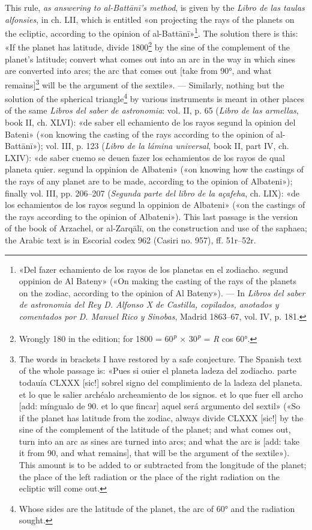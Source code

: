 \documentclass[11pt]{article}
\begin{document}
\par This rule, \emph{as answering to al-Battānī's method}, is given by the \emph{Libro de las taulas alfonsies}, in ch. LII, which is entitled «on projecting the rays of the planets on the ecliptic, according to the opinion of al-Battānī»\footnote{«Del fazer echamiento de los rayos de los planetas en el zodiacho. segund oppinion de Al Bateny» («On making the casting of the rays of the planets on the zodiac, according to the opinion of Al Bateny»). — In \emph{Libros del saber de astronomia del Rey D. Alfonso X de Castilla, copilados, anotados y comentados por D. Manuel Rico y Sinobas}, Madrid 1863–67, vol. IV, p. 181.}. The solution there is this: «If the planet has latitude, divide 1800\footnote{Wrongly 180 in the edition; for 1800 = 60\textsuperscript{\itshape p} × 30\textsuperscript{\itshape p} = \emph{R} cos 60°.} by the sine of the complement of the planet's latitude; convert what comes out into an arc in the way in which sines are converted into arcs; the arc that comes out [take from 90°, and what remains]\footnote{The words in brackets I have restored by a safe conjecture. The Spanish text of the whole passage is: «Pues si ouier el planeta ladeza del zodiacho. parte todauía CLXXX [sic!] sobrel signo del complimiento de la ladeza del planeta. et lo que le salier archéalo archeamiento de los signos. et lo que fuer ell archo [add: míngualo de 90. et lo que fincar] aquel será argumento del sextil» («So if the planet has latitude from the zodiac, always divide CLXXX [sic!] by the sine of the complement of the latitude of the planet; and what comes out, turn into an arc as sines are turned into arcs; and what the arc is [add: take it from 90, and what remains], that will be the argument of the sextile»). This amount is to be added to or subtracted from the longitude of the planet; the place of the left radiation or the place of the right radiation on the ecliptic will come out.} will be the argument of the sextile». — Similarly, nothing but the solution of the spherical triangle\footnote{Whose sides are the latitude of the planet, the arc of 60° and the radiation sought.} by various instruments is meant in other places of the same \emph{Libros del saber de astronomia}: vol. II, p. 65 (\emph{Libro de las armellas}, book II, ch. XLVI): «de saber ell echamiento de los rayos segund la opinion del Bateni» («on knowing the casting of the rays according to the opinion of al-Battānī»); vol. III, p. 123 (\emph{Libro de la lámina universal}, book II, part IV, ch. LXIV): «de saber cuemo se deuen fazer los echamientos de los rayos de qual planeta quier. segund la oppinion de Albateni» («on knowing how the castings of the rays of any planet are to be made, according to the opinion of Albateni»); finally vol. III, pp. 206–207 (\emph{Segunda parte del libro de la açafeha}, ch. LIX): «de los echamientos de los rayos segund la oppinion de Albateni» («on the castings of the rays according to the opinion of Albateni»). This last passage is the version of the book of Arzachel, or al-Zarqālī, on the construction and use of the saphaea; the Arabic text is in Escorial codex 962 (Casiri no. 957), ff. 51r–52r.\par
\end{document}
